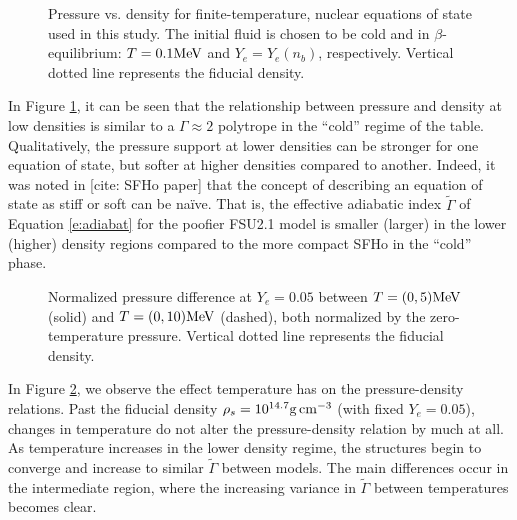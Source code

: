 \begin{figure}
	\centering
	
	\caption[Pressure vs. density for a cold, beta-equilibrium slice]{
		Pressure vs. density for finite-temperature, nuclear equations of state used in this study. The initial fluid is chosen to be cold and in $\beta$-equilibrium: $T=0.1 {\rm MeV}$ and $Y_e = Y_e (n_b)$, respectively.  Vertical dotted line represents the fiducial density.
	}
	\label{fig:PvsRho}
\end{figure}

In Figure \ref{fig:PvsRho}, it can be seen that the relationship between pressure and density at low densities is similar to a $\Gamma \approx 2$ polytrope in the ``cold'' regime of the table.  Qualitatively, the pressure support at lower densities can be stronger for one equation of state, but softer at higher densities compared to another.  Indeed, it was noted in [cite: SFHo paper] that the concept of describing an equation of state as stiff or soft can be na\"{i}ve.  That is, the effective adiabatic index $\tilde{\Gamma}$ of Equation \ref{e:adiabat} for the poofier FSU2.1 model is smaller (larger) in the lower (higher) density regions compared to the more compact SFHo in the ``cold'' phase.

\begin{figure}
	\centering
	
	\caption[]{
		Normalized pressure difference at $Y_e = 0.05$ between $T = (0,5) {\rm MeV}$ (solid) and $T = (0,10) {\rm MeV}$ (dashed), both normalized by the zero-temperature pressure. Vertical dotted line represents the fiducial density.
	}
	\label{fig:dPvsRho}
\end{figure}

In Figure \ref{fig:dPvsRho}, we observe the effect temperature has on the pressure-density relations.  Past the fiducial density $\rho_s = 10^{14.7} {\rm g \, cm^{-3}}$ (with fixed $Y_e = 0.05$), changes in temperature do not alter the pressure-density relation by much at all.  As temperature increases in the lower density regime, the structures begin to converge and increase to similar $\tilde{\Gamma}$ between models.  The main differences occur in the intermediate region, where the increasing variance in $\tilde{\Gamma}$ between temperatures becomes clear.